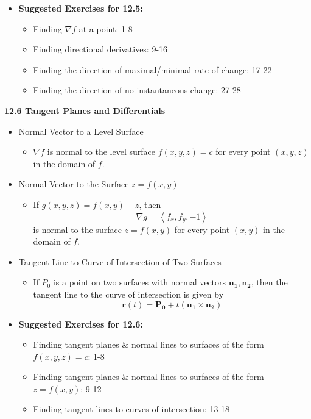 \documentclass[12pt]{article}
\renewcommand{\vec}[1]{\mathbf{#1}}
\newcommand{\<}{\left<}
\renewcommand{\>}{\right>}
\begin{document}
\begin{itemize}
\item \textbf{Suggested Exercises for 12.5:}

  \begin{itemize}
  \item Finding $\nabla f$ at a point: 1-8
  \item Finding directional derivatives: 9-16
  \item Finding the direction of maximal/minimal rate of change: 17-22
  \item Finding the direction of no instantaneous change: 27-28
  \end{itemize}

\end{itemize}

\newpage

\centerline{\bf 12.6 Tangent Planes and Differentials}

\begin{itemize}

  \item Normal Vector to a Level Surface
    \begin{itemize}
      \item 
        $\nabla f$ is normal to the level surface $f(x,y,z)=c$ for every point $(x,y,z)$ in the domain of $f$.
    \end{itemize}
    
  \item Normal Vector to the Surface $z=f(x,y)$
    \begin{itemize}
      \item 
        If $g(x,y,z)=f(x,y)-z$, then \[\nabla g = \<f_x,f_y,-1\>\] is normal to the surface $z=f(x,y)$ for every point $(x,y)$ in the domain of $f$.
    \end{itemize}
    
  \item Tangent Line to Curve of Intersection of Two Surfaces
    \begin{itemize}
      \item 
        If $P_0$ is a point on two surfaces with normal vectors $\vec{n_1},\vec{n_2}$, then the tangent line to the curve of intersection is given by
        \[
          \vec{r}(t) = \vec{P_0} + t(\vec{n_1} \times \vec{n_2})
        \]
    \end{itemize}
    
  \item \textbf{Suggested Exercises for 12.6:}
  
    \begin{itemize}
    \item Finding tangent planes \& normal lines to surfaces of the form $f(x,y,z)=c$: 1-8
    \item Finding tangent planes \& normal lines to surfaces of the form $z=f(x,y)$: 9-12
    \item Finding tangent lines to curves of intersection: 13-18
    \end{itemize}
  
\end{itemize}
\end{document}
